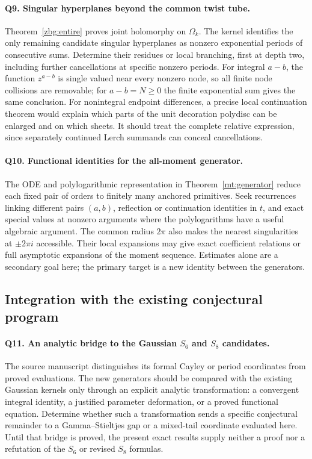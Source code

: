 \paragraph{Q9. Singular hyperplanes beyond the common twist tube.}
Theorem~\ref{zbg:entire} proves joint holomorphy on $\Omega_k$.
The kernel identifies the only remaining candidate singular
hyperplanes as nonzero exponential periods of consecutive sums.
Determine their residues or local branching, first at depth two,
including further cancellations at specific nonzero periods.
For integral $a-b$, the function $z^{a-b}$ is single valued near
every nonzero node, so all finite node collisions are removable;
for $a-b=N\geq0$ the finite exponential sum gives the same conclusion.
For nonintegral endpoint differences,
a precise local continuation theorem would explain which parts of
the unit decoration polydisc can be enlarged and on which sheets.
It should treat the complete relative expression, since separately
continued Lerch summands can conceal cancellations.

\paragraph{Q10. Functional identities for the all-moment generator.}
The ODE and polylogarithmic representation in
Theorem~\ref{mt:generator} reduce each fixed pair of orders to
finitely many anchored primitives. Seek recurrences linking different
pairs $(a,b)$, reflection or continuation identities in $t$, and exact
special values at nonzero arguments where the polylogarithms have a
useful algebraic argument. The common radius $2\pi$ also makes the
nearest singularities at $\pm2\pi i$ accessible. Their local
expansions may give exact coefficient relations or full asymptotic
expansions of the moment sequence. Estimates alone are a secondary
goal here; the primary target is a new identity between the generators.

\subsection{Integration with the existing conjectural program}

\paragraph{Q11. An analytic bridge to the Gaussian $S_6$ and $S_8$ candidates.}
The source manuscript distinguishes its formal Cayley or period
coordinates from proved evaluations. The new generators should be
compared with the existing Gaussian kernels only through an explicit
analytic transformation: a convergent integral identity, a justified
parameter deformation, or a proved functional equation. Determine
whether such a transformation sends a specific conjectural remainder
to a Gamma--Stieltjes gap or a mixed-tail coordinate evaluated here.
Until that bridge is proved, the present exact results supply neither
a proof nor a refutation of the $S_6$ or revised $S_8$ formulas.

